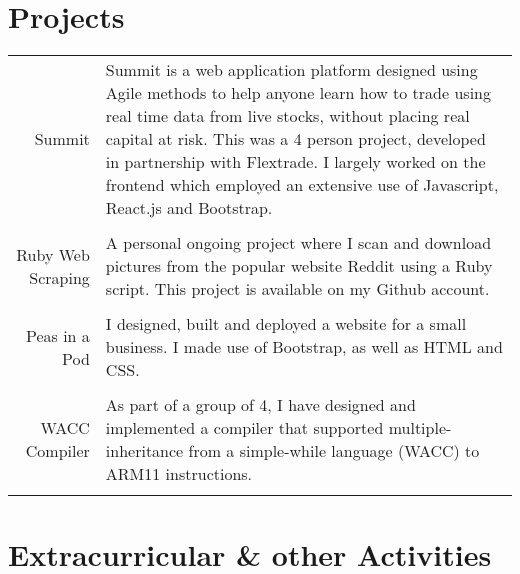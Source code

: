 \documentclass[a4paper,10pt]{article}
\begin{document}
	\section*{Projects}
	
	\begin{tabular}{r|p{12cm}}
		
		Summit  & Summit is a web application platform designed using Agile methods to help anyone learn how to trade using real time data from live stocks, without placing real capital at risk. This was a 4 person project, developed in partnership with Flextrade. I largely worked on the frontend which employed an extensive use of Javascript, React.js and Bootstrap.
		\\\multicolumn{2}{c}{} \\
		
		Ruby Web Scraping & A personal ongoing project where I scan and download pictures from the popular website Reddit using a Ruby script. This project is available on my Github account.
		\\\multicolumn{2}{c}{} \\
		
		Peas in a Pod & I designed, built and deployed a website for a small business. I made use of Bootstrap, as well as HTML and CSS. 
		 \\\multicolumn{2}{c}{} \\
		 
		WACC Compiler & As part of a group of 4, I have designed and implemented a compiler that supported multiple-inheritance from a simple-while language (WACC) to ARM11 instructions. 
		\\\multicolumn{2}{c}{} \\
		
	\end{tabular}
	
	\section*{Extracurricular \& other Activities}
	
\end{document}
